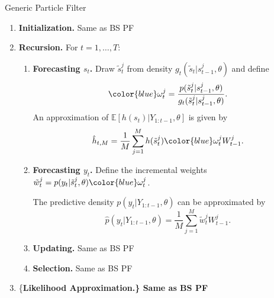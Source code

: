 \documentclass[presentation]{beamer}
\newcommand{\be}{\begin{equation}}
\newcommand{\ee}{\end{equation}}
\begin{document}
\begin{frame}[label={sec:org496cfd4}]{Generic Particle Filter}
\begin{enumerate}
	\item {\bf Initialization.} Same as BS PF		
	\item {\bf Recursion.} For $t=1,\ldots,T$:
	\begin{enumerate}
		\item {\bf Forecasting $s_t$.} Draw $\tilde{s}_t^j$ from density $g_t(\tilde{s}_t|s_{t-1}^j,\theta)$
		and define 
		\be
		{\color{blue} \omega_t^j = \frac{p(\tilde{s}_t^j|s_{t-1}^j,\theta)}{g_t(\tilde{s}_t^j|s_{t-1}^j,\theta)}.}
		\label{eq_generalpfomega}
		\ee
		An approximation of $\mathbb{E}[h(s_t)|Y_{1:t-1},\theta]$ is given by
		\be
		\hat{h}_{t,M} = \frac{1}{M} \sum_{j=1}^M h(\tilde{s}_t^j) {\color{blue} \omega_t^j} W_{t-1}^j.
		\label{eq_generalpfhtt1}
		\ee
		\item {\bf Forecasting $y_t$.} Define the incremental weights
		$\tilde{w}^j_t = p(y_t|\tilde{s}^j_t,\theta) {\color{blue} \omega_t^j}$.

		The predictive density $p(y_t|Y_{1:t-1},\theta)$
		can be approximated by
		\be
		\hat{p}(y_t|Y_{1:t-1},\theta) = \frac{1}{M} \sum_{j=1}^M \tilde{w}^j_t W_{t-1}^j.
		\ee
		\item {\bf Updating.} Same as BS PF		
		\item {\bf Selection.} Same as BS PF		
	\end{enumerate}

\item \{\bf Likelihood Approximation.\} Same as BS PF		
\end{enumerate}
\end{frame}
\end{document}
